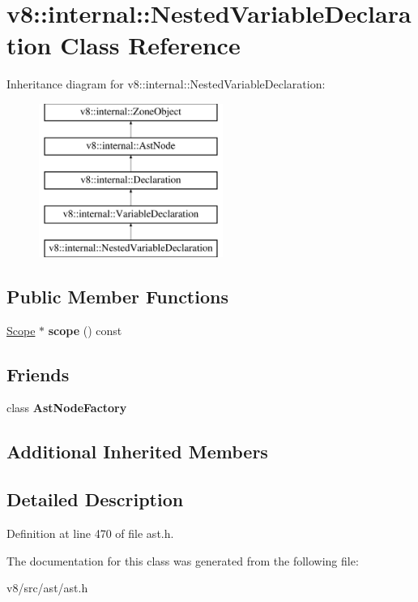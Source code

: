 \hypertarget{classv8_1_1internal_1_1NestedVariableDeclaration}{}\section{v8\+:\+:internal\+:\+:Nested\+Variable\+Declaration Class Reference}
\label{classv8_1_1internal_1_1NestedVariableDeclaration}
Inheritance diagram for v8\+:\+:internal\+:\+:Nested\+Variable\+Declaration\+:\begin{figure}[H]
\begin{center}
\leavevmode
\includegraphics[height=5.000000cm]{classv8_1_1internal_1_1NestedVariableDeclaration}
\end{center}
\end{figure}
\subsection*{Public Member Functions}
\begin{DoxyCompactItemize}
\item 
\mbox{\label{classv8_1_1internal_1_1NestedVariableDeclaration_acaf316fa5e28b0fe075be9781c1304b5}} 
\mbox{\hyperlink{classv8_1_1internal_1_1Scope}{Scope}} $\ast$ {\bfseries scope} () const
\end{DoxyCompactItemize}
\subsection*{Friends}
\begin{DoxyCompactItemize}
\item 
\mbox{\label{classv8_1_1internal_1_1NestedVariableDeclaration_a8d587c8ad3515ff6433eb83c578e795f}} 
class {\bfseries Ast\+Node\+Factory}
\end{DoxyCompactItemize}
\subsection*{Additional Inherited Members}


\subsection{Detailed Description}


Definition at line 470 of file ast.\+h.



The documentation for this class was generated from the following file\+:\begin{DoxyCompactItemize}
\item 
v8/src/ast/ast.\+h\end{DoxyCompactItemize}
